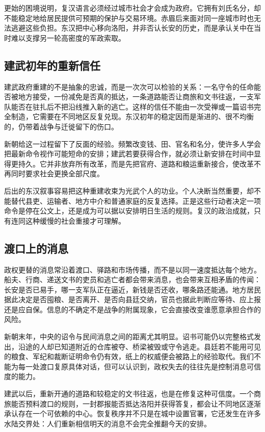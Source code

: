 更始的困境说明，复汉语言必须经过城市社会才会成为政府。它拥有刘氏名分，却不能稳定地给居民提供可预期的保护与交易环境。赤眉后来面对同一座城市时也无法逃避这些负担。东汉把中心移向洛阳，并非否认长安的历史，而是承认关中在当时难以支撑另一轮高密度的军政索取。

\subsection{建武初年的重新信任}

建武政府重建的不是抽象的忠诚，而是一次次可以检验的关系：一名守令的任命能否被地方接受，一份减免是否真的抵达，一条道路能否让商旅和文书往返，一支军队能否在驻扎后不把沿线推入新的逃亡。这样的信任不能由一次受禅或一篇诏书完全制造，它需要在不同地区反复兑现。东汉初年的稳定因而是渐进的、很不均衡的，仍带着战争与迁徙留下的伤口。

新朝给这一过程留下了反面的经验。频繁改变钱、田、官名和名分，使许多人学会把最新命令视作可能短命的安排；建武若要获得合作，就必须让新安排在时间中显得更持久。它并非放弃所有改革，而是先把官府、道路和粮运重新接合，使改革不再同时要求社会更换全部尺度。

后出的东汉叙事容易把这种重建收束为光武个人的功业。个人决断当然重要，却不能替代县吏、运输者、地方中介和普通家庭的反复选择。正是这些行动者决定一项命令是停在公文上，还是成为可以据以安排明日生活的规则。复汉的政治成就，只有连同这种缓慢的社会重接才可理解。

\subsection{渡口上的消息}

政权更替的消息常沿着渡口、驿路和市场传播，而不是以同一速度抵达每个地方。船夫、行商、递送文书的吏员和逃亡者都会带来消息，也会带来互相矛盾的传闻：长安是否已易手，哪一支军队正在逼近，新钱是否还收，哪条路还能通。地方居民据此决定是否囤粮、是否离开、是否向县廷交纳，官员也据此判断应等待、应上报还是应自保。信息的不确定不是战争的附属现象，它会直接改变谁愿意承担合作的风险。

新朝末年，中央的诏令与民间消息之间的距离尤其明显。诏书可能仍以完整格式发出，沿途的人却已知道附近的仓库被夺、桥梁被毁或守令逃走。县廷若不能用可见的粮食、军纪和裁断证明命令仍有效，纸上的权威便会被路上的经验取代。我们不能为每一处渡口复原具体对话，但可以认识到，政权失去的往往先是控制消息可信度的能力。

建武以后，重新开通的道路和较稳定的文书往返，也是在修复这种可信度。一个商旅能否预料渡口的规则，一封郡报能否抵达洛阳并获得答复，都会让不同地区逐渐承认存在一个可依赖的中心。恢复秩序并不只是在城中设置官署，它还发生在许多水陆交界处：人们重新相信明天的消息不会完全推翻今天的安排。


